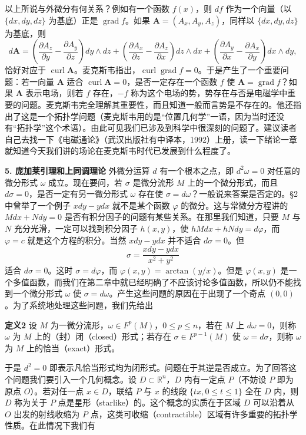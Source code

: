 以上所说与外微分有何关系？例如有一个函数 $f(x)$，则 $df$ 作为一个向量（以 $\{dx,dy,dz\}$ 为基底）正是 $\operatorname{grad}f$。如果 $\mathbf A=(A_x,A_y,A_z)$，同样以 $\{dx,dy,dz\}$ 为基底，则
\[
 d\mathbf A
 =\left(\frac{\partial A_z}{\partial y}-\frac{\partial A_y}{\partial z}\right)dy\wedge dz
 +\left(\frac{\partial A_x}{\partial z}-\frac{\partial A_z}{\partial x}\right)dz\wedge dx
 +\left(\frac{\partial A_y}{\partial x}-\frac{\partial A_x}{\partial y}\right)dx\wedge dy,
\]
恰好对应于 $\operatorname{curl}\mathbf A$。麦克斯韦指出，$\operatorname{curl}\operatorname{grad}f=0$。于是产生了一个重要问题：若一向量 $\mathbf A$ 适合 $\operatorname{curl}\mathbf A=0$，是否一定存在一个函数 $f$ 使 $\mathbf A=\operatorname{grad}f$？如果 $\mathbf A$ 表示电场，则若 $f$ 存在，$-f$ 称为这个电场的势，势存在与否是电磁学中重要的问题。麦克斯韦完全理解其重要性，而且知道一般而言势是不存在的。他还指出了这是一个拓扑学问题（麦克斯韦用的是“位置几何学”一语，因为当时还没有“拓扑学”这个术语）。由此可见我们已涉及到科学中很深刻的问题了。建议读者自己去找一下《电磁通论》（武汉出版社有中译本，1992）上册，读一下绪论一章就知道今天我们讲的场论在麦克斯韦时代已发展到什么程度了。

\noindent\textbf{5. 庞加莱引理和上同调理论}\quad
外微分运算 $d$ 有一个根本之点，即 $d^2\omega=0$ 对任意的微分形式 $\omega$ 成立。现在要问，若 $\sigma$ 是微分流形 $M$ 上的一个微分形式，而且 $d\sigma=0$，是否一定有另一微分形式 $\omega$ 存在使 $\sigma=d\omega$？一般说来答案是否定的。§2 中曾举了一个例子 $xdy-ydx$ 就不是某个函数 $\varphi$ 的微分。这与常微分方程讲的 $Mdx+Ndy=0$ 是否有积分因子的问题有某些关系。在那里我们知道，只要 $M$ 与 $N$ 充分光滑，一定可以找到积分因子 $h(x,y)$，使 $hMdx+hNdy=d\varphi$，而 $\varphi=c$ 就是这个方程的积分。当然 $xdy-ydx$ 并不适合 $d\sigma=0$。但
\[
 \sigma=\frac{xdy-ydx}{x^2+y^2}
\]
适合 $d\sigma=0$。这时 $\sigma=d\varphi$，而 $\varphi(x,y)=\arctan(y/x)$。但是 $\varphi(x,y)$ 是一个多值函数，而我们在第二章中就已经明确了不应该讨论多值函数，所以仍不能找到一个微分形式 $\omega$ 使 $\sigma=d\omega$。产生这些问题的原因在于出现了一个奇点 $(0,0)$。为了系统地处理这些问题，我们先给出

\noindent\textbf{定义2}
设 $M$ 为一微分流形，$\omega\in F^p(M)$，$0\le p\le n$，若在 $M$ 上 $d\omega=0$，则称 $\omega$ 为 $M$ 上的（封）闭（closed）形式；若存在 $\sigma\in F^{p-1}(M)$ 使 $\omega=d\sigma$，则称 $\omega$ 为 $M$ 上的恰当（exact）形式。

于是 $d^2=0$ 即表示凡恰当形式均为闭形式。问题在于其逆是否成立。为了回答这个问题我们要引入一个几何概念。设 $D\subset\mathbb R^n$，$D$ 内有一定点 $P$（不妨设 $P$ 即为原点 $O$）。若对任一点 $x\in D$，联结 $P$ 与 $x$ 的线段 $\{tx,0\le t\le1\}$ 全在 $D$ 内，则 $D$ 称为关于 $P$ 点是星形（starlike）的。这个概念的实质在于区域 $D$ 可以沿着从 $O$ 出发的射线收缩为 $P$ 点，这类可收缩（contractible）区域有许多重要的拓扑学性质。在此情况下我们有

